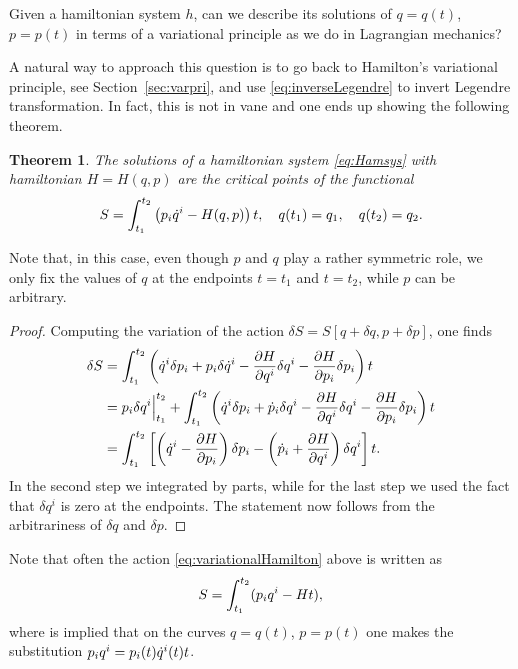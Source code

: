 \documentclass[english,fontsize=11pt,paper=a5,oneside]{scrbook}
\let\d\relax
\DeclareMathOperator{\d}{d}
\newtheorem{theorem}{Theorem}[chapter]
\theoremstyle{definition}
\begin{document}
Given a hamiltonian system $h$, can we describe its solutions of $q=q(t)$, $p=p(t)$ in terms of a variational principle as we do in Lagrangian mechanics?

A natural way to approach this question is to go back to Hamilton's variational principle, see Section~\ref{sec:varpri}, and use \eqref{eq:inverseLegendre} to invert Legendre transformation.
In fact, this is not in vane and one ends up showing the following theorem.

\begin{theorem}\label{thm:variationalHamilton}
    The solutions of a hamiltonian system \eqref{eq:Hamsys} with hamiltonian $H=H(q,p)$ are the critical points of the functional
    \begin{equation}\label{eq:variationalHamilton}
        S = \int_{t_1}^{t_2} \left(p_i\dot q^i - H(q,p)\right) \d t,
        \quad q(t_1) = q_1, \quad q(t_2) = q_2.
    \end{equation}
\end{theorem}
Note that, in this case, even though $p$ and $q$ play a rather symmetric role, we only fix the values of $q$ at the endpoints $t=t_1$ and $t=t_2$, while $p$ can be arbitrary.

\begin{proof}
    Computing the variation of the action $\delta S = S[q+\delta q, p + \delta p]$, one finds
    \begin{align}
        \delta S
        &= \int_{t_1}^{t_2} \left( \dot q^i \delta p_i + p_i \delta \dot q^i - \frac{\partial H}{\partial q^i}\delta q^i - \frac{\partial H}{\partial p_i}\delta p_i \right) \d t \\
        &= p_i \delta q^i\Big|_{t_1}^{t_2} + \int_{t_1}^{t_2} \left( \dot q^i \delta p_i + \dot p_i \delta q^i - \frac{\partial H}{\partial q^i}\delta q^i - \frac{\partial H}{\partial p_i}\delta p_i \right) \d t \\
        &= \int_{t_1}^{t_2} \left[
            \left(\dot q^i - \frac{\partial H}{\partial p_i} \right) \delta p_i 
            - \left(\dot p_i + \frac{\partial H}{\partial q^i}\right) \delta q^i
        \right] \d t.
    \end{align}
    In the second step we integrated by parts, while for the last step we used the fact that $\delta q^i$ is zero at the endpoints.
    The statement now follows from the arbitrariness of $\delta q$ and $\delta p$.
\end{proof}

Note that often the action \eqref{eq:variationalHamilton} above is written as
\begin{equation}
    S = \int_{t_1}^{t_2} (p_i \d q^i - H \d t),
\end{equation}
where is implied that on the curves $q=q(t)$, $p=p(t)$ one makes the substitution $p_i \d q^i = p_i(t) \dot q^i (t) \d t$.
\end{document}
